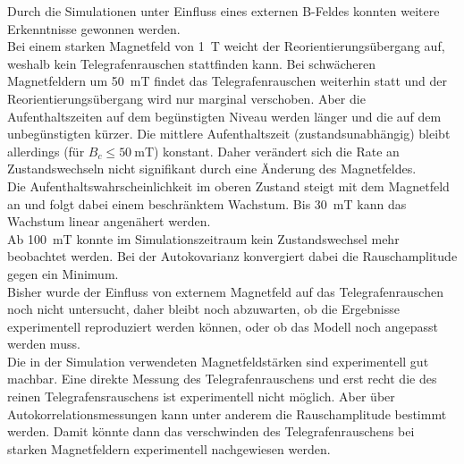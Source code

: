 \documentclass[main.tex]{subfiles}
\begin{document}
Durch die Simulationen unter Einfluss eines externen B-Feldes konnten weitere Erkenntnisse gewonnen werden.\\
Bei einem starken Magnetfeld von \SI{1}{\tesla} weicht der Reorientierungsübergang auf, weshalb kein Telegrafenrauschen stattfinden kann. Bei schwächeren Magnetfeldern um \SI{50}{\milli\tesla} findet das Telegrafenrauschen weiterhin statt und der Reorientierungsübergang wird nur marginal verschoben. Aber die Aufenthaltszeiten auf dem begünstigten Niveau werden länger und die auf dem unbegünstigten kürzer. Die mittlere Aufenthaltszeit (zustandsunabhängig) bleibt allerdings (für \(B_c \leq \SI{50}{\milli\tesla}\)) konstant. Daher verändert sich die Rate an Zustandswechseln nicht signifikant durch eine Änderung des Magnetfeldes.\\
Die Aufenthaltswahrscheinlichkeit im oberen Zustand steigt mit dem Magnetfeld an und folgt dabei einem beschränktem Wachstum. Bis \SI{30}{\milli\tesla} kann das Wachstum linear angenähert werden.\\ 
Ab \SI{100}{\milli\tesla} konnte im Simulationszeitraum kein Zustandswechsel mehr beobachtet werden. Bei der Autokovarianz konvergiert dabei die Rauschamplitude gegen ein Minimum. \\



Bisher wurde der Einfluss von externem Magnetfeld auf das Telegrafenrauschen noch nicht untersucht, daher bleibt noch abzuwarten, ob die Ergebnisse experimentell reproduziert werden können, oder ob das Modell noch angepasst werden muss.\\
Die in der Simulation verwendeten Magnetfeldstärken sind experimentell gut machbar. Eine direkte Messung des Telegrafenrauschens und erst recht die des reinen Telegrafensrauschens ist experimentell nicht möglich. Aber über Autokorrelationsmessungen kann unter anderem die Rauschamplitude bestimmt werden. Damit könnte dann das verschwinden des Telegrafenrauschens bei starken Magnetfeldern experimentell nachgewiesen werden.\\
\end{document}
